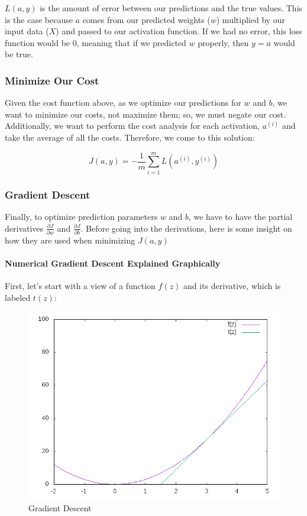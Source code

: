 \documentclass{article}
\newcommand{\myparagraph}[1]{\paragraph{#1}\mbox{}}
\begin{document}
$L(a,y)$ is the amount of error between our predictions and the true values.  This is the case because $a$ comes from our predicted weights ($w$) multiplied by our input data ($X$) and passed to our activation function.  If we had no error, this loss function would be 0, meaning that if we predicted $w$ properly, then $y = a$ would be true.

\subsubsection{Minimize Our Cost}

Given the cost function above, as we optimize our predictions for $w$ and $b$, we want to minimize our costs, not maximize them; so, we must negate our cost.  Additionally, we want to perform the cost analysis for each activation, $a^{(i)}$ and take the average of all the costs. Therefore, we come to this solution:

$$J(a,y) = -\frac{1}{m} \sum_{i=1}^{m} L(a^{(i)},y^{(i)})$$

\subsubsection{Gradient Descent}

Finally, to optimize prediction parameters $w$ and $b$, we have to have the partial derivatives $\frac{\partial{J}}{\partial{w}}$ and $\frac{\partial{J}}{\partial{b}}$.  Before going into the derivations, here is some insight on how they are used when minimizing $J(a,y)$

\myparagraph{Numerical Gradient Descent Explained Graphically}

First, let's start with a view of a function $f(z)$ and its derivative, which is labeled $t(z)$:

\begin{figure}[H]
\includegraphics[width=\linewidth]{grad_descent.png}
\caption{Gradient Descent}
\label{fig:grad_descent}
\end{figure}
\end{document}
